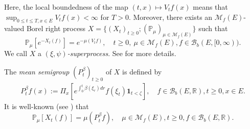 \documentclass[12pt,a4paper]{amsart}
\numberwithin{equation}{section}
\theoremstyle{plain}
\theoremstyle{definition}
\theoremstyle{remark}
\begin{document}
	 Here, the local boundedness of the map $(t,x) \mapsto V_tf(x)$ means that $\sup_{0\leq t\leq T, x\in E} V_tf(x)< \infty$ for $T >0$.
	Moreover, there exists an $\mathcal M_f(E)$-valued Borel right process $X =\{(X_t)_{t\geq 0}; (\mathbb P_\mu)_{\mu \in \mathcal M_f(E)}\}$ such that
\begin{equation}
	\mathbb P_\mu[e^{- X_t(f)}]
	= e^{- \mu(V_tf)},
	\quad t\geq 0,~\mu \in \mathcal M_f(E), f \in \mathcal B_b(E,[0,\infty)).
\end{equation}
	We call $X$ a \emph{$(\xi, \psi)$-superprocess}.
	See \cite{Li2011MeasureValued} for more details.


The \emph{mean semigroup} $(P_t^\beta)_{t\geq 0}$ of $X$ is defined by
\begin{align}
	P_t^\beta f(x)
	:= \Pi_x\left[e^{\int_0^t \beta(\xi_r)dr }f(\xi_t)  \mathbf 1_{t < \zeta}\right],
	\quad f\in \mathcal B_b(E,\mathbb R), t\geq 0, x\in E.
\end{align}
	It is well-known (see \cite[Proposition 2.27]{Li2011MeasureValued}) that
\begin{equation} \label{Fact:M!}
	\mathbb P_\mu[X_t(f)] = \mu (P_t^\beta f),
	\quad \mu \in \mathcal M_f(E), t\geq 0, f \in \mathcal B_b(E,\mathbb R).
\end{equation}	
\end{document}
